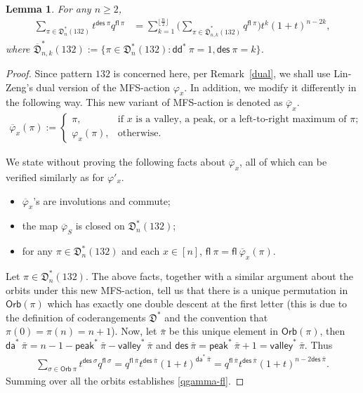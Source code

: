 \documentclass[12pt,reqno]{amsart}
\numberwithin{equation}{section}
\theoremstyle{plain}
\newtheorem{lemma}[theorem]{Lemma}
\theoremstyle{definition}
\def\D{\mathfrak{D}}
\def\da{\mathsf{da}}
\def\dd{\mathsf{dd}}
\def\des{\mathsf{des}}
\def\valley{\mathsf{valley}}
\def\peak{\mathsf{peak}}
\def\Orb{\mathsf{Orb}}
\def\fl{\mathsf{fl}}
\begin{document}
\begin{lemma}\label{lem:132-fl}
For any $n\ge 2$,
\begin{align}\label{qgamma-fl}
\sum_{\pi\in\D^*_n(132)}t^{\des\:\pi}q^{\fl\:\pi} &= \sum_{k=1}^{\lfloor\frac{n}{2}\rfloor}\biggl(\sum_{\pi\in\overline{\D}^*_{n,k}(132)}q^{\fl\:\pi}\biggr)t^k(1+t)^{n-2k},
\end{align}
where $\overline{\D}^*_{n,k}(132):=\{\pi\in\D^*_n(132): \dd^*\:\pi=1, \des\:\pi=k\}$.
\end{lemma}
\begin{proof}
Since pattern $132$ is concerned here, per Remark~\ref{dual}, we shall use Lin-Zeng's dual version of the MFS-action $\varphi_x$. In addition, we modify it differently in the following way. This new variant of MFS-action is denoted as $\overline{\varphi}_x$.
\begin{align*}
\overline{\varphi}_x(\pi):=
\begin{cases}
\pi,& \text{if $x$ is a valley, a peak, or a left-to-right maximum of $\pi$;}\\
\varphi_x(\pi),&\text{otherwise}.
\end{cases}
\end{align*}

We state without proving the following facts about $\overline{\varphi}_x$, all of which can be verified similarly as for $\varphi'_x$.
\begin{itemize}
	\item $\overline{\varphi}_x$'s are involutions and commute;
	\item the map $\overline{\varphi}_S$ is closed on $\D^*_n(132)$;
	\item for any $\pi\in\D^*_n(132)$ and each $x\in[n]$, $\fl\:\pi=\fl\:\overline{\varphi}_x(\pi)$.
\end{itemize}

Let $\pi\in\D^*_n(132)$. The above facts, together with a similar argument about the orbits under this new MFS-action, tell us that there is a unique permutation in $\Orb(\pi)$ which has exactly one double descent at the first letter (this is due to the definition of coderangements $\D^*$ and the convention that $\pi(0)=\pi(n)=n+1$). Now, let $\bar\pi$ be this unique element in $\Orb(\pi)$, then $\da^*\:\bar{\pi}=n-1-\peak^*\:\bar{\pi}-\valley^*\:\bar{\pi}$ and $\des\:\bar{\pi}=\peak^*\:\bar{\pi}+1=\valley^*\:\bar{\pi}$. Thus
\begin{align*}
\sum_{\sigma\in\Orb\:\pi}t^{\des\:\sigma}q^{\fl\:\sigma}=
q^{\fl\:\bar{\pi}}t^{\des\:\bar{\pi}}(1+t)^{\da^*\:\bar{\pi}}
=q^{\fl\:\bar{\pi}}t^{\des\:\bar{\pi}}(1+t)^{n-2\des\:\bar{\pi}}.
\end{align*}
Summing over all the orbits establishes \eqref{qgamma-fl}.
\end{proof}
\end{document}
